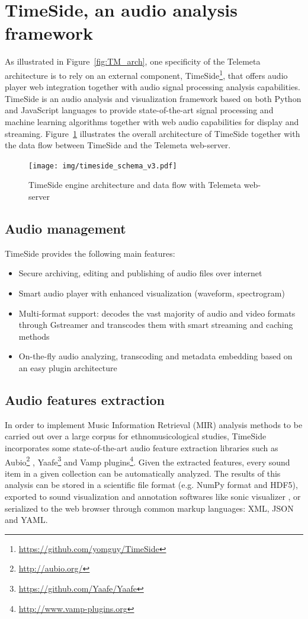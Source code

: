 \documentclass{sig-alternate}
\begin{document}
\section{TimeSide, an audio analysis framework}\label{sec:TimeSide}
As illustrated in Figure~\ref{fig:TM_arch}, one specificity of the Telemeta architecture is to rely on an external component, TimeSide\footnote{\url{https://github.com/yomguy/TimeSide}}, that offers audio player web integration together with audio signal processing analysis capabilities. 
TimeSide is an audio analysis and visualization framework based on both Python and JavaScript languages to provide state-of-the-art signal processing and machine learning algorithms together with web audio capabilities for display and streaming.
Figure~\ref{fig:TimeSide_Archi} illustrates the overall architecture of TimeSide together with the data flow between TimeSide and the Telemeta web-server.
\begin{figure}[htbp]
  \centering
  \texttt{[image: img/timeside\_schema\_v3.pdf]}
  \caption{TimeSide engine architecture and data flow with Telemeta web-server}\label{fig:TimeSide_Archi}
\end{figure}

\subsection{Audio management}
TimeSide provides the following main features:
\begin{itemize}
\item Secure archiving, editing and publishing of audio files over
  internet
\item Smart audio player with enhanced visualization (waveform, spectrogram)
\item Multi-format support: decodes the vast majority of audio and video formats through Gstreamer and transcodes them with smart streaming and caching methods%
\item On-the-fly audio analyzing, transcoding and metadata
    embedding based on an easy plugin architecture
\end{itemize}
\subsection{Audio features extraction}
In order to implement Music Information Retrieval (MIR) analysis methods to be carried out over a large corpus for ethnomusicological studies, TimeSide incorporates some state-of-the-art audio feature extraction libraries such as Aubio\footnote{\url{http://aubio.org/}} \cite{brossierPhD}, Yaafe\footnote{\url{https://github.com/Yaafe/Yaafe}} \cite{yaafe_ISMIR2010} and Vamp plugins\footnote{ \url{http://www.vamp-plugins.org}}.
Given the extracted features, every sound item in a given collection can be automatically analyzed. The results of this analysis can be stored in a scientific file format (e.g. NumPy format and HDF5), exported to sound visualization and annotation softwares like sonic visualizer \cite{cannam2006sonic}, or serialized to the web browser through common markup languages: XML, JSON and YAML.
\end{document}
